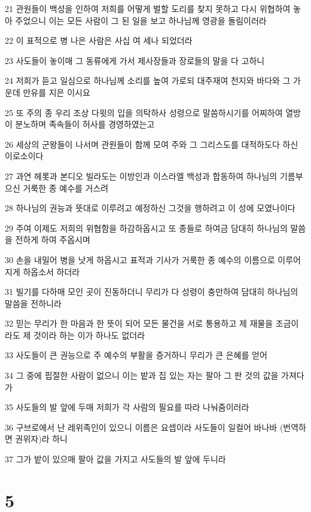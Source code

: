 \par 21 관원들이 백성을 인하여 저희를 어떻게 벌할 도리를 찾지 못하고 다시 위협하여 놓아 주었으니 이는 모든 사람이 그 된 일을 보고 하나님께 영광을 돌림이러라
\par 22 이 표적으로 병 나은 사람은 사십 여 세나 되었더라
\par 23 사도들이 놓이매 그 동류에게 가서 제사장들과 장로들의 말을 다 고하니
\par 24 저희가 듣고 일심으로 하나님께 소리를 높여 가로되 대주재여 천지와 바다와 그 가운데 만유를 지은 이시요
\par 25 또 주의 종 우리 조상 다윗의 입을 의탁하사 성령으로 말씀하시기를 어찌하여 열방이 분노하며 족속들이 허사를 경영하였는고
\par 26 세상의 군왕들이 나서며 관원들이 함께 모여 주와 그 그리스도를 대적하도다 하신 이로소이다
\par 27 과연 헤롯과 본디오 빌라도는 이방인과 이스라엘 백성과 합동하여 하나님의 기름부으신 거룩한 종 예수를 거스려
\par 28 하나님의 권능과 뜻대로 이루려고 예정하신 그것을 행하려고 이 성에 모였나이다
\par 29 주여 이제도 저희의 위협함을 하감하옵시고 또 종들로 하여금 담대히 하나님의 말씀을 전하게 하여 주옵시며
\par 30 손을 내밀어 병을 낫게 하옵시고 표적과 기사가 거룩한 종 예수의 이름으로 이루어지게 하옵소서 하더라
\par 31 빌기를 다하매 모인 곳이 진동하더니 무리가 다 성령이 충만하여 담대히 하나님의 말씀을 전하니라
\par 32 믿는 무리가 한 마음과 한 뜻이 되어 모든 물건을 서로 통용하고 제 재물을 조금이라도 제 것이라 하는 이가 하나도 없더라
\par 33 사도들이 큰 권능으로 주 예수의 부활을 증거하니 무리가 큰 은혜를 얻어
\par 34 그 중에 핍절한 사람이 없으니 이는 밭과 집 있는 자는 팔아 그 판 것의 값을 가져다가
\par 35 사도들의 발 앞에 두매 저희가 각 사람의 필요를 따라 나눠줌이러라
\par 36 구브로에서 난 레위족인이 있으니 이름은 요셉이라 사도들이 일컬어 바나바 (번역하면 권위자)라 하니
\par 37 그가 밭이 있으매 팔아 값을 가지고 사도들의 발 앞에 두니라

\chapter{5}

